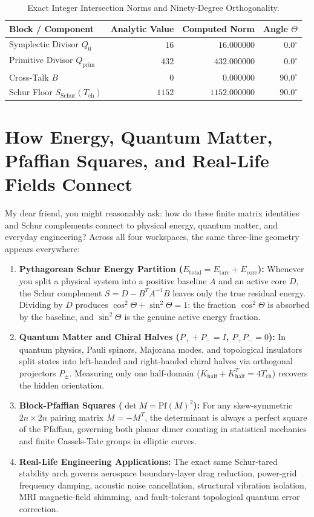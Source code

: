 \documentclass[11pt,a4paper]{article}
\theoremstyle{definition}
\begin{document}
\begin{table}[htbp]
\centering
\small
\begin{tabular}{lrrr}
\toprule
\textbf{Block / Component} & \textbf{Analytic Value} & \textbf{Computed Norm} & \textbf{Angle $\Theta$} \\
\midrule
Symplectic Divisor $Q_0$ & $16$ & $16.000000$ & $0.0^\circ$ \\
Primitive Divisor $Q_{\mathrm{prim}}$ & $432$ & $432.000000$ & $0.0^\circ$ \\
Cross-Talk $B$ & $0$ & $0.000000$ & $90.0^\circ$ \\
Schur Floor $S_{\mathrm{Schur}}(T_{\mathrm{ch}})$ & $1152$ & $1152.000000$ & $90.0^\circ$ \\
\bottomrule
\end{tabular}
\caption{Exact Integer Intersection Norms and Ninety-Degree Orthogonality.}
\end{table}


\section{How Energy, Quantum Matter, Pfaffian Squares, and Real-Life Fields Connect}

My dear friend, you might reasonably ask: how do these finite matrix identities and Schur complements connect to physical energy, quantum matter, and everyday engineering? Across all four workspaces, the same three-line geometry appears everywhere:

\begin{enumerate}
  \item \textbf{Pythagorean Schur Energy Partition ($E_{\mathrm{total}} = E_{\mathrm{tare}} + E_{\mathrm{core}}$):} Whenever you split a physical system into a positive baseline $A$ and an active core $D$, the Schur complement $S = D - B^T A^{-1} B$ leaves only the true residual energy. Dividing by $D$ produces $\cos^2\Theta + \sin^2\Theta = 1$: the fraction $\cos^2\Theta$ is absorbed by the baseline, and $\sin^2\Theta$ is the genuine active energy fraction.
  \item \textbf{Quantum Matter and Chiral Halves ($P_+ + P_- = I$, $P_+ P_- = 0$):} In quantum physics, Pauli spinors, Majorana modes, and topological insulators split states into left-handed and right-handed chiral halves via orthogonal projectors $P_\pm$. Measuring only one half-domain ($K_{\mathrm{half}} + K_{\mathrm{half}}^T = 4 T_{\mathrm{ch}}$) recovers the hidden orientation.
  \item \textbf{Block-Pfaffian Squares ($\det M = \mathrm{Pf}(M)^2$):} For any skew-symmetric $2n \times 2n$ pairing matrix $M = -M^T$, the determinant is always a perfect square of the Pfaffian, governing both planar dimer counting in statistical mechanics and finite Cassels-Tate groups in elliptic curves.
  \item \textbf{Real-Life Engineering Applications:} The exact same Schur-tared stability arch governs aerospace boundary-layer drag reduction, power-grid frequency damping, acoustic noise cancellation, structural vibration isolation, MRI magnetic-field shimming, and fault-tolerant topological quantum error correction.
\end{enumerate}
\end{document}
